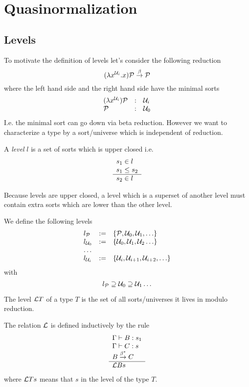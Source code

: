\section{Quasinormalization}





\subsection{Levels}

To motivate the definition of levels let's consider the following reduction
$$
    (\lambda x^{{\cal U}_i}. x) {\cal P} \stackrel{\beta}{\to} {\cal P}
$$
where the left hand side and the right hand side have the minimal sorts
$$
    \begin{array}{lll}
        (\lambda x^{{\cal U}_i}) {\cal P} &:& {\cal U}_i
        \\
        {\cal P} &:& {\cal U}_0
    \end{array}
$$
I.e. the minimal sort can go down via beta reduction. However we want to
characterize a type by a sort/universe which is independent of reduction.


\begin{definition}
    A \emph{level} $l$ is a set of sorts which is upper closed i.e.
    $$
    \begin{array}{l} s_1 \in l \\ s_1 \le s_2 \\ \hline s_2 \in l\end{array}
    $$
\end{definition}

Because levels are upper closed, a level which is a superset of another level
must contain extra sorts which are lower than the other level.

We define the following levels
$$
\begin{array}{lll}
    l_{\cal P} &:=& \{{\cal P}, {\cal U}_0, {\cal U}_1, \ldots\}
    \\
    l_{{\cal U}_0} &:=& \{ {\cal U}_0, {\cal U}_1, {\cal U}_2 \ldots \}
    \\
    \ldots
    \\
    l_{{\cal U}_i} &:=& \{ {\cal U}_i, {\cal U}_{i+1}, {\cal U}_{i+2}, \ldots \}
\end{array}
$$
with
$$
    l_{\cal P} \supseteq {\cal U}_0 \supseteq {\cal U}_1 \ldots
$$


\begin{definition}
    The level ${\cal L} T$ of a type $T$ is the set of all sorts/universes it
    lives in modulo reduction.

    The relation ${\cal L}$ is defined inductively by the rule
    $$
    \begin{array}{l} 
        \Gamma \vdash B: s_1
        \\
        \Gamma \vdash C: s
        \\
        B \stackrel{\beta^*}{\to} C
     \\ \hline {\cal L} B s\end{array}
    $$
    where ${\cal L} T s$ means that $s$ in the level of the type $T$.
\end{definition}

